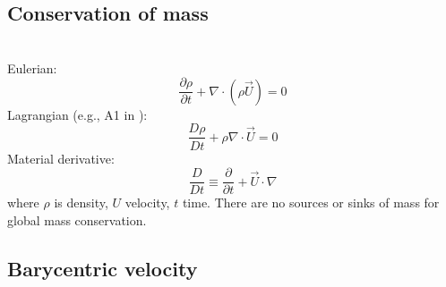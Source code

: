 
\subsection{Conservation of mass}

\\

\noindent
Eulerian:
\begin{equation}
\frac{\partial \rho}{\partial t} + \nabla \cdot ( \rho \vec{U} ) = 0
\end{equation}
Lagrangian (e.g., A1 in \cite{ABE95}):
\begin{equation}
\frac{D \rho}{Dt} + \rho \nabla \cdot \vec{U} = 0
\end{equation}
Material derivative:
\begin{equation}
\frac{D}{Dt} \equiv \frac{\partial}{\partial t} + \vec{U} \cdot \nabla
\end{equation}
where $\rho$ is density, $U$ velocity, $t$ time.  There are no sources or sinks of mass for global mass conservation.

\subsection{Barycentric velocity}

\\

